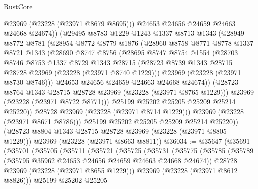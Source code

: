\begin{lexlean}{RustCore}
\begin{coremodule}
                @23969
                (@23228 (@23971 @8679 @8695)))
              @24653
              @24656
              @24659
              @24663
              @24668
              @24674))
          (@29495
            @8783
            @1229
            @1243
            @1337
            @8713
            @1343
            (@28949
              @8772
              @8781
              (@28954
                @8772
                @8779
                @1876
                (@28960
                  @8758
                  @8771
                  @8778
                  @1337
                  @8721
                  @1343
                  (@28690
                    @8747
                    @8756
                    (@28695
                      @8747
                      @8754
                      @1554
                      (@28703
                        @8746
                        @8753
                        @1337
                        @8729
                        @1343
                        @28715
                        (@28723 @8739 @1343 @28715 @28728 @23969 (@23228 (@23971 @8740 @1229)))
                        @23969
                        (@23228 (@23971 @8730 @8746)))
                      @24653
                      @24656
                      @24659
                      @24663
                      @24668
                      @24674))
                  (@28723 @8764 @1343 @28715 @28728 @23969 (@23228 (@23971 @8765 @1229)))
                  @23969
                  (@23228 (@23971 @8722 @8771)))
                @25199
                @25202
                @25205
                @25209
                @25214
                @25220))
            @28728
            @23969
            (@23228 (@23971 @8714 @1229)))
          @23969
          (@23228 (@23971 @8671 @8786)))
        @25199
        @25202
        @25205
        @25209
        @25214
        @25220))
    (@28723 @8804 @1343 @28715 @28728 @23969 (@23228 (@23971 @8805 @1229)))
    @23969
    (@23228 (@23971 @8663 @8811))
@36034 := @35647
    (@35691
      (@35701
        (@35705
          (@35711
            (@35721
              (@35725
                (@35731
                  (@35775
                    (@35785
                      (@35789 (@35795 @35962 @24653 @24656 @24659 @24663 @24668 @24674))
                      @28728
                      @23969
                      (@23228 (@23971 @8655 @1229)))
                    @23969
                    (@23228 (@23971 @8612 @8826)))
                  @25199
                  @25202
                  @25205

\end{coremodule}
\end{lexlean}
